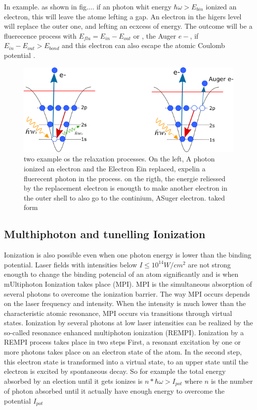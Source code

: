 In example. as shown in fig.... if an photon  whit energy $\hbar\omega > E_{bin}$  ionized an electron, this will leave the atome lefting a gap. An electron in the higers level will replace the outer one, and lefting an ecxcess of energy. The outcome will be a fluerecence process with $E_{flu} = E_{in}- E_{out}$ or , the Auger $e-$, if $ E_{in}-E_{out} > E_{bond}$ and this electron can also escape the atomic Coulomb potential \cite{schmidt_electron_1997}.

\begin{figure}[hbtp] \label{fig:augerfluorec}
\centering
\includegraphics[width=6 cm]{../Images/text6418.png}
\caption[Relaxation processes for photoionization]{two example os the relaxation processes. On the left, A photon ionized an electron and the Electron Ein replaced, expelin a fluerecent photon in the process. on the rigth, the energie reliessed by the replacement electron is enougth to make another electron in the outer shell to also go to the continium, ASuger electron. taked form \cite{rafipoor_two-color_2017}}
\end{figure}

\subsection{Multhiphoton and tunelling Ionization}

Ionization is also possible even when one photon energy is lower than the binding potential. Laser fields with intensities below $I \leqslant 10^{14}W/cm^{2}$ are not strong enougth to change the binding potencial of an atom significantly \cite{rhodes_multiphoton_1985} and is when mUltiphoton Ionization takes place (MPI).  MPI is the simultaneous absorption of several photons to overcome the ionization barrier. The way MPI occurs depends on the laser frequency and intensity. When the intensity is much lower than the characteristic atomic resonance, MPI occurs via transitions through virtual states. Ionization by several photons at low laser intensities can be realized by the so-called resonance enhanced multiphoton ionization (REMPI)\cite{mainfray_multiphoton_nodate}.  Ionization by a REMPI process takes place in two steps
First, a resonant excitation by one or more photons takes place on an electron state of the atom. In the second step, this electron state is transformed into a virtual state, to an upper state until the electron is excited by spontaneous decay. So for example the total energy absorbed by an election until it gets ionizes is $n * \hbar\omega > I_{pot}$ where $n$ is the number of photon absorbed until it actually have enough energy to overcome the potential $I_{pot}$

